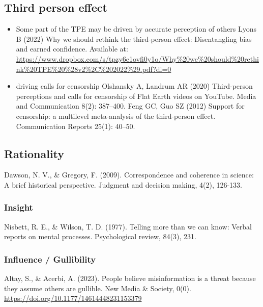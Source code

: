 \documentclass[
  ,jou,floatsintext]{apa6}
\begin{document}
\hypertarget{third-person-effect}{%
\subsection{Third person effect}\label{third-person-effect}}

\begin{itemize}
\item
  Some part of the TPE may be driven by accurate perception of others
  Lyons B (2022) Why we should rethink the third-person effect: Disentangling bias and earned confidence. Available at: \url{https://www.dropbox.com/s/tpzy6e1ovfi0y1o/Why\%20we\%20should\%20rethink\%20TPE\%20\%28v2\%2C\%202022\%29.pdf?dl=0}
\item
  driving calls for censorship
  Olshansky A, Landrum AR (2020) Third-person perceptions and calls for censorship of Flat Earth videos on YouTube. Media and Communication 8(2): 387--400.
  Feng GC, Guo SZ (2012) Support for censorship: a multilevel meta-analysis of the third-person effect. Communication Reports 25(1): 40--50.
\end{itemize}

\hypertarget{rationality}{%
\subsection{Rationality}\label{rationality}}

Dawson, N. V., \& Gregory, F. (2009). Correspondence and coherence in science: A brief historical perspective. Judgment and decision making, 4(2), 126-133.

\hypertarget{insight}{%
\subsubsection{Insight}\label{insight}}

Nisbett, R. E., \& Wilson, T. D. (1977). Telling more than we can know: Verbal reports on mental processes. Psychological review, 84(3), 231.

\hypertarget{influence-gullibility}{%
\subsubsection{Influence / Gullibility}\label{influence-gullibility}}

Altay, S., \& Acerbi, A. (2023). People believe misinformation is a threat because they assume others are gullible. New Media \& Society, 0(0). \url{https://doi.org/10.1177/14614448231153379}
\end{document}
